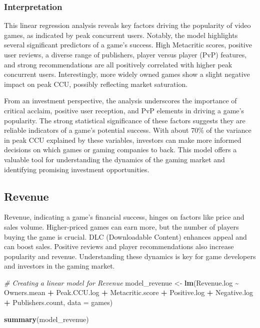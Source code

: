 \documentclass[
]{article}
\newenvironment{Shaded}{\begin{snugshade}}{\end{snugshade}}
\newcommand{\AttributeTok}[1]{\textcolor[rgb]{0.13,0.29,0.53}{#1}}
\newcommand{\CommentTok}[1]{\textcolor[rgb]{0.56,0.35,0.01}{\textit{#1}}}
\newcommand{\FunctionTok}[1]{\textcolor[rgb]{0.13,0.29,0.53}{\textbf{#1}}}
\newcommand{\NormalTok}[1]{#1}
\newcommand{\OtherTok}[1]{\textcolor[rgb]{0.56,0.35,0.01}{#1}}
\newcommand{\SpecialCharTok}[1]{\textcolor[rgb]{0.81,0.36,0.00}{\textbf{#1}}}
\begin{document}
\hypertarget{interpretation}{%
\subsubsection{Interpretation}\label{interpretation}}

This linear regression analysis reveals key factors driving the
popularity of video games, as indicated by peak concurrent users.
Notably, the model highlights several significant predictors of a game's
success. High Metacritic scores, positive user reviews, a diverse range
of publishers, player versus player (PvP) features, and strong
recommendations are all positively correlated with higher peak
concurrent users. Interestingly, more widely owned games show a slight
negative impact on peak CCU, possibly reflecting market saturation.

From an investment perspective, the analysis underscores the importance
of critical acclaim, positive user reception, and PvP elements in
driving a game's popularity. The strong statistical significance of
these factors suggests they are reliable indicators of a game's
potential success. With about 70\% of the variance in peak CCU explained
by these variables, investors can make more informed decisions on which
games or gaming companies to back. This model offers a valuable tool for
understanding the dynamics of the gaming market and identifying
promising investment opportunities.

\hypertarget{revenue}{%
\subsection{Revenue}\label{revenue}}

Revenue, indicating a game's financial success, hinges on factors like
price and sales volume. Higher-priced games can earn more, but the
number of players buying the game is crucial. DLC (Downloadable Content)
enhances appeal and can boost sales. Positive reviews and player
recommendations also increase popularity and revenue. Understanding
these dynamics is key for game developers and investors in the gaming
market.

\begin{Shaded}
\begin{Highlighting}[]
\CommentTok{\# Creating a linear model for Revenue}
\NormalTok{model\_revenue }\OtherTok{\textless{}{-}} \FunctionTok{lm}\NormalTok{(Revenue.log }\SpecialCharTok{\textasciitilde{}}\NormalTok{  Owners.mean }\SpecialCharTok{+}\NormalTok{ Peak.CCU.log }\SpecialCharTok{+}
\NormalTok{                      Metacritic.score }\SpecialCharTok{+}\NormalTok{ Positive.log }\SpecialCharTok{+}\NormalTok{ Negative.log }\SpecialCharTok{+}
\NormalTok{                      Publishers.count, }\AttributeTok{data =}\NormalTok{ games)}

\FunctionTok{summary}\NormalTok{(model\_revenue)}
\end{Highlighting}
\end{Shaded}
\end{document}
